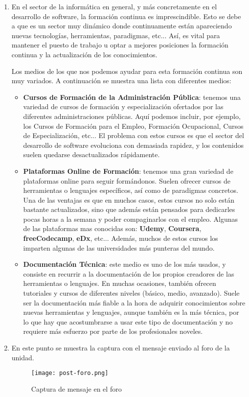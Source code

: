 \begin{enumerate}[label={(\alph*)}]
    \item En el sector de la informática en general, y más concretamente en el desarrollo de software, la formación continua es imprescindible. Esto se debe a que es un sector muy dinámico donde continuamente están apareciendo nuevas tecnologías, herramientas, paradigmas, etc... Así, es vital para mantener el puesto de trabajo u optar a mejores posiciones la formación continua y la actualización de los conocimientos.

    Los medios de los que nos podemos ayudar para esta formación continua son muy variados. A continuación se muestra una lista con diferentes medios:
    \begin{itemize}
        \item \textbf{Cursos de Formación de la Administración Pública}: tenemos una variedad de cursos de formación y especialización ofertados por las diferentes administraciones públicas. Aquí podemos incluir, por ejemplo, los Cursos de Formación para el Empleo, Formación Ocupacional, Cursos de Especialización, etc... El problema con estos cursos es que el sector del desarrollo de software evoluciona con demasiada rapidez, y los contenidos suelen quedarse desactualizados rápidamente.

        \item \textbf{Plataformas Online de Formación}: tenemos una gran variedad de plataformas online para seguir formándonos. Suelen ofrecer cursos de herramientas o lenguajes específicos, así como de paradigmas concretos. Una de las ventajas es que en muchos casos, estos cursos no solo están bastante actualizados, sino que además están pensados para dedicarles pocas horas a la semana y poder compaginarlos con el empleo. Algunas de las plataformas mas conocidas son: \textbf{Udemy}, \textbf{Coursera}, \textbf{freeCodecamp}, \textbf{eDx}, etc... Además, muchos de estos cursos los imparten algunas de las universidades más punteras del mundo.

        \item \textbf{Documentación Técnica}: este medio es uno de los más usados, y consiste en recurrir a la documentación de los propios creadores de las herramientas o lenguajes. En muchas ocasiones, también ofrecen tutoriales y cursos de diferentes niveles (básico, medio, avanzado). Suele ser la documentación más fiable a la hora de adquirir conocimientos sobre nuevas herramientas y lenguajes, aunque también es la más técnica, por lo que hay que acostumbrarse a usar este tipo de documentación y no requiere más esfuerzo por parte de los profesionales noveles.
    \end{itemize}

    \item En este punto se muestra la captura con el mensaje enviado al foro de la unidad.

        \begin{figure}[ht]
        \centering
        \texttt{[image: post-foro.png]}
        \caption{Captura de mensaje en el foro}
    \end{figure}
\end{enumerate}

